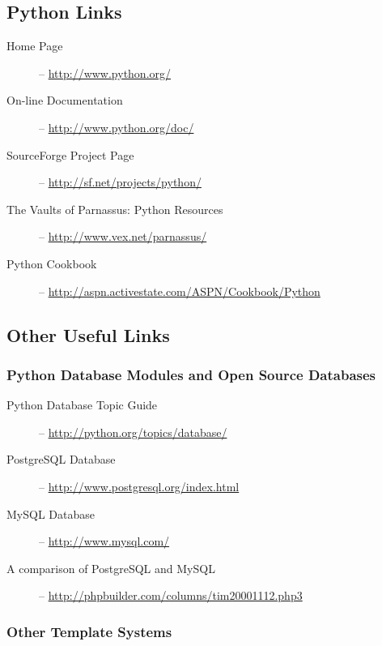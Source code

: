 \subsection{Python Links}
\label{links.python}

\begin{description}
\item[Home Page] -- \url{http://www.python.org/}
\item[On-line Documentation] -- \url{http://www.python.org/doc/}
\item[SourceForge Project Page] -- \url{http://sf.net/projects/python/}
\item[The Vaults of Parnassus: Python Resources] --
     \url{http://www.vex.net/parnassus/}
\item[Python Cookbook] -- \url{http://aspn.activestate.com/ASPN/Cookbook/Python}
\end{description}

\subsection{Other Useful Links}
\label{links.other}


\subsubsection{Python Database Modules and Open Source Databases}
\label{links.other}

\begin{description}
\item[Python Database Topic Guide] -- \url{http://python.org/topics/database/}
\item[PostgreSQL Database] -- \url{http://www.postgresql.org/index.html}
\item[MySQL Database] -- \url{http://www.mysql.com/}
\item[A comparison of PostgreSQL and MySQL] --
     \url{http://phpbuilder.com/columns/tim20001112.php3}
\end{description}

\subsubsection{Other Template Systems}
\label{links.other.templateSystems}

